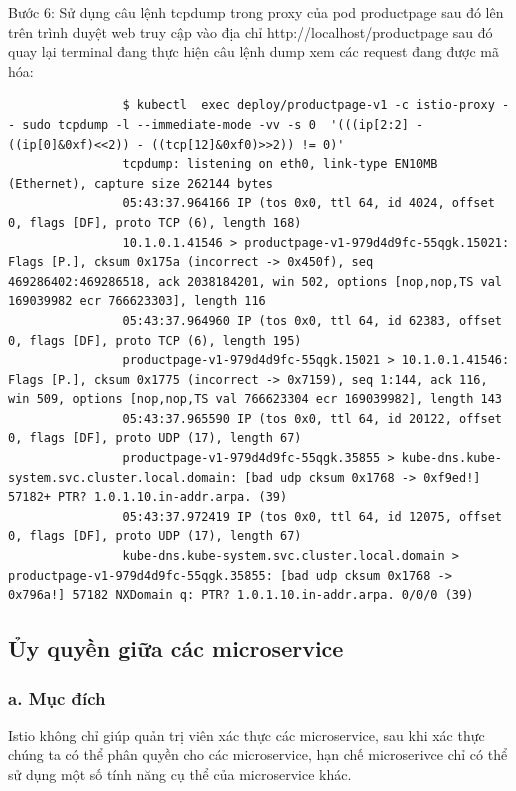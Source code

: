 \documentclass[12pt,a4paper]{report}
\begin{document}
{{				Bước 6: Sử dụng câu lệnh tcpdump trong proxy của pod productpage sau đó lên trên trình duyệt web truy cập vào địa chỉ http://localhost/productpage sau đó quay lại terminal đang thực hiện câu lệnh dump xem các request đang được mã hóa:
				\begin{lstlisting}
				$ kubectl  exec deploy/productpage-v1 -c istio-proxy -- sudo tcpdump -l --immediate-mode -vv -s 0  '(((ip[2:2] - ((ip[0]&0xf)<<2)) - ((tcp[12]&0xf0)>>2)) != 0)'
				tcpdump: listening on eth0, link-type EN10MB (Ethernet), capture size 262144 bytes
				05:43:37.964166 IP (tos 0x0, ttl 64, id 4024, offset 0, flags [DF], proto TCP (6), length 168)
				10.1.0.1.41546 > productpage-v1-979d4d9fc-55qgk.15021: Flags [P.], cksum 0x175a (incorrect -> 0x450f), seq 469286402:469286518, ack 2038184201, win 502, options [nop,nop,TS val 169039982 ecr 766623303], length 116
				05:43:37.964960 IP (tos 0x0, ttl 64, id 62383, offset 0, flags [DF], proto TCP (6), length 195)
				productpage-v1-979d4d9fc-55qgk.15021 > 10.1.0.1.41546: Flags [P.], cksum 0x1775 (incorrect -> 0x7159), seq 1:144, ack 116, win 509, options [nop,nop,TS val 766623304 ecr 169039982], length 143
				05:43:37.965590 IP (tos 0x0, ttl 64, id 20122, offset 0, flags [DF], proto UDP (17), length 67)
				productpage-v1-979d4d9fc-55qgk.35855 > kube-dns.kube-system.svc.cluster.local.domain: [bad udp cksum 0x1768 -> 0xf9ed!] 57182+ PTR? 1.0.1.10.in-addr.arpa. (39)
				05:43:37.972419 IP (tos 0x0, ttl 64, id 12075, offset 0, flags [DF], proto UDP (17), length 67)
				kube-dns.kube-system.svc.cluster.local.domain > productpage-v1-979d4d9fc-55qgk.35855: [bad udp cksum 0x1768 -> 0x796a!] 57182 NXDomain q: PTR? 1.0.1.10.in-addr.arpa. 0/0/0 (39)
				\end{lstlisting}
				
				
		\subsection{Ủy quyền giữa các microservice}
			\subsubsection{a. Mục đích}
			{\hspace{0.6cm}Istio không chỉ giúp quản trị viên xác thực các microservice, sau khi xác thực chúng ta có thể phân quyền cho các microservice, hạn chế microserivce chỉ có thể sử dụng một số tính năng cụ thể của microservice khác.}
}}
\end{document}
